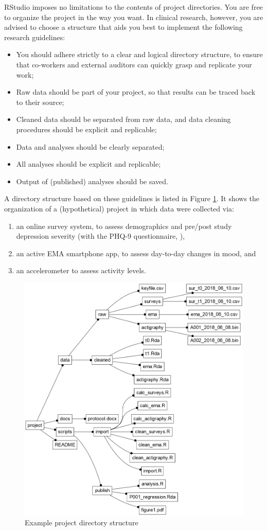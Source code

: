 \documentclass[]{book}
\begin{document}

RStudio imposes no limitations to the contents of project directories.
You are free to organize the project in the way you want. In clinical
research, however, you are advised to choose a structure that aids you
best to implement the following research guidelines:

\begin{itemize}
\item
  You should adhere strictly to a clear and logical directory structure,
  to ensure that co-workers and external auditors can quickly grasp and
  replicate your work;
\item
  Raw data should be part of your project, so that results can be traced
  back to their source;
\item
  Cleaned data should be separated from raw data, and data cleaning
  procedures should be explicit and replicable;
\item
  Data and analyses should be clearly separated;
\item
  All analyses should be explicit and replicable;
\item
  Output of (published) analyses should be saved.
\end{itemize}

A directory structure based on these guidelines is listed in Figure
\ref{fig:dm-project-tree}. It shows the organization of a (hypothetical)
project in which data were collected via:

\begin{enumerate}
\def\labelenumi{\arabic{enumi}.}
\item
  an online survey system, to assess demographics and pre/post study
  depression severity (with the PHQ-9 questionnaire,
  \citet{Kroenke2009}),
\item
  an active EMA smartphone app, to assess day-to-day changes in mood,
  and
\item
  an accelerometer to assess activity levels.
\end{enumerate}

\begin{figure}

{\centering \includegraphics[width=0.5\linewidth]{images/datamanagement/project_tree} 

}

\caption{Example project directory structure}\label{fig:dm-project-tree}
\end{figure}
\end{document}
